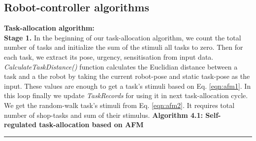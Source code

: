 \documentclass[preprint,12pt]{elsarticle}
\newcommand{\HRule}{\rule{\linewidth}{0.3mm}}
\begin{document}
\subsection{Robot-controller algorithms}
\textbf{Task-allocation algorithm:}\\
\textbf{Stage 1.} In the beginning of our task-allocation algorithm, we count the total number of tasks and initialize the sum of the stimuli all tasks to zero. Then for each task, we extract its pose, urgency, sensitisation from input data.\\  \textit{CalculateTaskDistance()} function calculates the Euclidian distance between a task and a the robot by taking the current robot-pose and static task-pose as the input. These values are enough to get a task's stimuli based on Eq. \ref{eqn:afm1}. In this loop finally we update \textit{TaskRecords} for using it in next task-allocation cycle. We get the random-walk task's stimuli from Eq. \ref{eqn:afm2}. It requires total number of shop-tasks and sum of their stimulus.
\newline
\textbf{Algorithm 4.1: Self-regulated task-allocation based on AFM}
\vspace{-3mm}
\newline
\HRule
\end{document}
